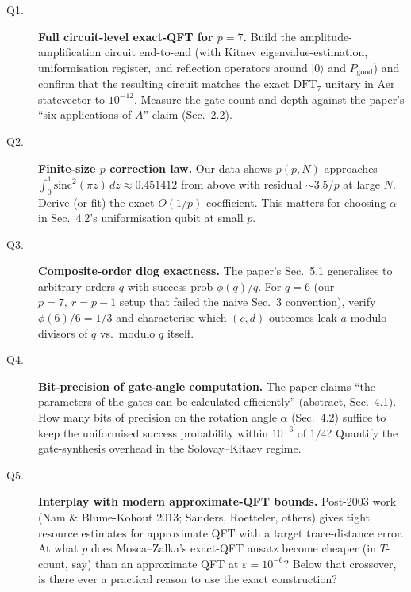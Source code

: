 \documentclass[11pt]{article}
\begin{document}
\begin{description}
  \item[Q1.] \textbf{Full circuit-level exact-QFT for $p=7$.} Build the
    amplitude-amplification circuit end-to-end (with Kitaev
    eigenvalue-estimation, uniformisation register, and reflection operators
    around $|0\rangle$ and $P_{\mathrm{good}}$) and confirm that the resulting
    circuit matches the exact $\text{DFT}_7$ unitary in Aer statevector to
    $10^{-12}$. Measure the gate count and depth against the paper's ``six
    applications of $A$'' claim (Sec.~2.2).
  \item[Q2.] \textbf{Finite-size $\bar p$ correction law.} Our data shows
    $\bar p(p, N)$ approaches $\int_0^1 \text{sinc}^2(\pi z)\, dz \approx 0.451412$
    from above with residual $\sim 3.5/p$ at large $N$. Derive (or fit) the
    exact $O(1/p)$ coefficient. This matters for choosing $\alpha$ in
    Sec.~4.2's uniformisation qubit at small $p$.
  \item[Q3.] \textbf{Composite-order dlog exactness.} The paper's Sec.~5.1
    generalises to arbitrary orders $q$ with success prob $\phi(q)/q$. For
    $q = 6$ (our $p=7,\ r = p-1$ setup that failed the naive Sec.~3
    convention), verify $\phi(6)/6 = 1/3$ and characterise which
    $(c, d)$ outcomes leak $a$ modulo divisors of $q$ vs.\ modulo $q$ itself.
  \item[Q4.] \textbf{Bit-precision of gate-angle computation.} The paper claims
    ``the parameters of the gates can be calculated efficiently'' (abstract, Sec.~4.1).
    How many bits of precision on the rotation angle $\alpha$ (Sec.~4.2) suffice
    to keep the uniformised success probability within $10^{-6}$ of $1/4$?
    Quantify the gate-synthesis overhead in the Solovay--Kitaev regime.
  \item[Q5.] \textbf{Interplay with modern approximate-QFT bounds.} Post-2003
    work (Nam \& Blume-Kohout 2013; Sanders, Roetteler, others) gives tight
    resource estimates for approximate QFT with a target trace-distance error.
    At what $p$ does Mosca--Zalka's exact-QFT ansatz become cheaper (in $T$-count,
    say) than an approximate QFT at $\varepsilon = 10^{-6}$? Below that
    crossover, is there ever a practical reason to use the exact construction?
\end{description}
\end{document}
